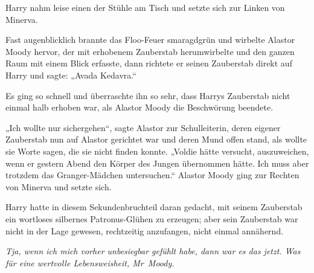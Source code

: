 Harry nahm leise einen der Stühle am Tisch und setzte sich zur Linken von Minerva.

Fast augenblicklich brannte das Floo-Feuer smaragdgrün und wirbelte Alastor Moody hervor, der mit erhobenem Zauberstab herumwirbelte und den ganzen Raum mit einem Blick erfasste, dann richtete er seinen Zauberstab direkt auf Harry und sagte: „Avada Kedavra.“

Es ging so schnell und überraschte ihn so sehr, dass Harrys Zauberstab nicht einmal halb erhoben war, als Alastor Moody die Beschwörung beendete.

„Ich wollte nur sichergehen“, sagte Alastor zur Schulleiterin, deren eigener Zauberstab nun auf Alastor gerichtet war und deren Mund offen stand, als wollte sie Worte sagen, die sie nicht finden konnte.
„Voldie hätte versucht, auszuweichen, wenn er gestern Abend den Körper des Jungen übernommen hätte. Ich muss aber trotzdem das Granger-Mädchen untersuchen.“
Alastor Moody ging zur Rechten von Minerva und setzte sich.

Harry hatte in diesem Sekundenbruchteil daran gedacht, mit seinem Zauberstab ein wortloses silbernes Patronus-Glühen zu erzeugen; aber sein Zauberstab war nicht in der Lage gewesen, rechtzeitig anzufangen, nicht einmal annähernd.

\emph{Tja, wenn ich mich vorher unbesiegbar gefühlt habe, dann war es das jetzt. Was für eine wertvolle Lebensweisheit, Mr~Moody.}

